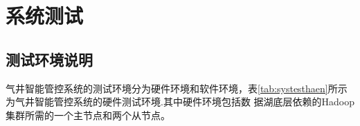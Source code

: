 \section{系统测试}
\subsection{测试环境说明}
气井智能管控系统的测试环境分为硬件环境和软件环境，表\ref{tab:systesthaen}所示为气井智能管控系统的硬件测试环境.其中硬件环境包括数
据湖底层依赖的Hadoop 集群所需的一个主节点和两个从节点。

